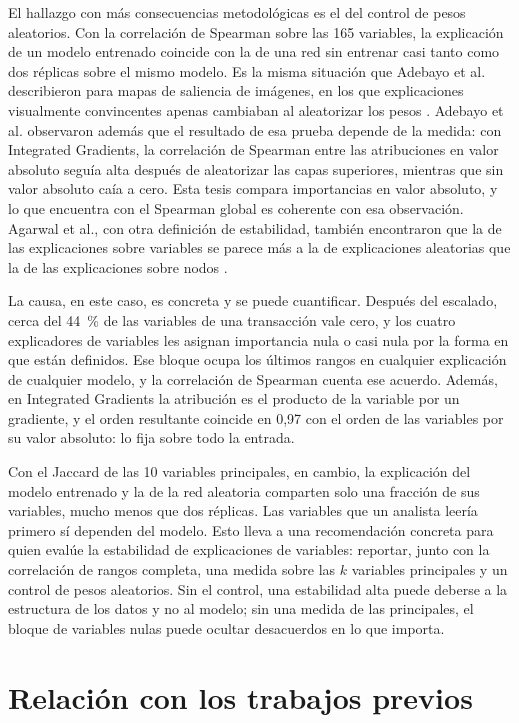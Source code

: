 El hallazgo con más consecuencias metodológicas es el del control de pesos aleatorios. Con la
correlación de Spearman sobre las 165 variables, la explicación de un modelo entrenado coincide
con la de una red sin entrenar casi tanto como dos réplicas sobre el mismo modelo. Es la misma
situación que Adebayo et al. describieron para mapas de saliencia de imágenes, en los que
explicaciones visualmente convincentes apenas cambiaban al aleatorizar los pesos
\cite{Adebayo2018Sanity}. Adebayo et al. observaron además que el resultado de esa prueba
depende de la medida: con Integrated Gradients, la correlación de Spearman entre las
atribuciones en valor absoluto seguía alta después de aleatorizar las capas superiores, mientras
que sin valor absoluto caía a cero. Esta tesis compara importancias en valor absoluto, y lo que
encuentra con el Spearman global es coherente con esa observación. Agarwal et al., con otra
definición de estabilidad, también encontraron que la de las explicaciones sobre variables se
parece más a la de explicaciones aleatorias que la de las explicaciones sobre nodos
\cite{Agarwal2023Evaluating}.

La causa, en este caso, es concreta y se puede cuantificar. Después del escalado, cerca del 44~\%
de las variables de una transacción vale cero, y los cuatro explicadores de variables les
asignan importancia nula o casi nula por la forma en que están definidos. Ese bloque ocupa los
últimos rangos en cualquier explicación de cualquier modelo, y la correlación de Spearman
cuenta ese acuerdo. Además, en Integrated Gradients la atribución es el producto de la variable
por un gradiente, y el orden resultante coincide en 0,97 con el orden de las variables por su
valor absoluto: lo fija sobre todo la entrada.

Con el Jaccard de las 10 variables principales, en cambio, la explicación del modelo entrenado
y la de la red aleatoria comparten solo una fracción de sus variables, mucho menos que dos
réplicas. Las variables que un analista leería primero sí dependen del modelo. Esto lleva a una
recomendación concreta para quien evalúe la estabilidad de explicaciones de variables: reportar,
junto con la correlación de rangos completa, una medida sobre las $k$ variables principales y un
control de pesos aleatorios. Sin el control, una estabilidad alta puede deberse a la estructura
de los datos y no al modelo; sin una medida de las principales, el bloque de variables nulas
puede ocultar desacuerdos en lo que importa.

\section{Relación con los trabajos previos}\label{sec:dis_literatura}

